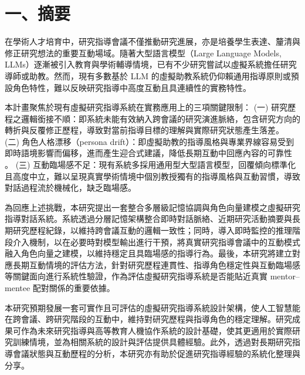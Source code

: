 \section*{一、摘要}
在學術人才培育中，研究指導會議不僅推動研究進展，亦是培養學生表達、釐清與修正研究想法的重要互動場域。隨著大型語言模型（Large Language Models, LLMs）逐漸被引入教育與學術輔導情境，已有不少研究嘗試以虛擬系統擔任研究導師或助教。然而，現有多數基於 LLM 的虛擬助教系統仍仰賴通用指導原則或預設角色特性，難以反映研究指導中高度互動且具連續性的實務特性。

本計畫聚焦於現有虛擬研究指導系統在實務應用上的三項關鍵限制：
(一) 研究歷程之邏輯銜接不順：即系統未能有效納入跨會議的研究演進脈絡，包含研究方向的轉折與反覆修正歷程，導致對當前指導目標的理解與實際研究狀態產生落差。
(二) 角色人格漂移（persona drift）：即虛擬助教的指導風格與專業界線容易受到即時語境影響而偏移，進而產生迎合式建議，降低長期互動中回應內容的可靠性 。
(三) 互動臨場感不足：現有系統多採用通用型大型語言模型，回覆傾向標準化且高度中立，難以呈現真實學術情境中個別教授獨有的指導風格與互動習慣，導致對話過程流於機械化，缺乏臨場感。

為回應上述挑戰，本研究提出一套整合多層級記憶協調與角色向量建模之虛擬研究指導對話系統。系統透過分層記憶架構整合即時對話脈絡、近期研究活動摘要與長期研究歷程紀錄，以維持跨會議互動的邏輯一致性；同時，導入即時監控的推理階段介入機制，以在必要時對模型輸出進行干預，將真實研究指導會議中的互動模式融入角色向量之建模，以維持穩定且具臨場感的指導行為。最後，本研究將建立對應長期互動情境的評估方法，針對研究歷程連貫性、指導角色穩定性與互動臨場感等關鍵面向進行系統性驗證，作為評估虛擬研究指導系統是否能貼近真實 mentor--mentee 配對關係的重要依據。

本研究預期發展一套可實作且可評估的虛擬研究指導系統設計架構，使人工智慧能在跨會議、跨研究階段的互動中，維持對研究歷程與指導角色的穩定理解。研究成果可作為未來研究指導與高等教育人機協作系統的設計基礎，使其更適用於實際研究訓練情境，並為相關系統的設計與評估提供具體經驗。此外，透過對長期研究指導會議狀態與互動歷程的分析，本研究亦有助於促進研究指導經驗的系統化整理與分享。